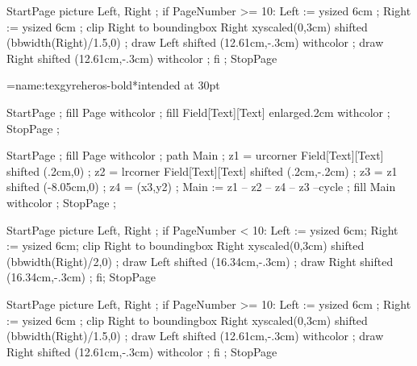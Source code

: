 StartPage
picture Left, Right ;
if PageNumber >= 10:
	Left := \sometxt{\framed[width=1.7cm,offset=0pt,align=middle,frame=off]{\color[outer]{\NumberFont \folio}}} ysized 6cm ; 
	Right := \sometxt{\framed[width=1.7cm,offset=0pt,align=middle,frame=off]{\color[inner]{\NumberFont \folio}}} ysized 6cm ; 
	clip Right to boundingbox Right xyscaled(0,3cm) shifted (bbwidth(Right)/1.5,0) ;
	draw Left shifted (12.61cm,-.3cm)  withcolor  ;
	draw Right shifted (12.61cm,-.3cm)  withcolor  ;
fi ;
StopPage
\stopuseMPgraphic
\endOLDTEX

\beginLUATEX
{}
\font\NumberFont=name:texgyreheros-bold*intended at 30pt


StartPage ;
fill Page withcolor  ;
fill Field[Text][Text] enlarged.2cm withcolor  ;
StopPage ;
\stopuniqueMPgraphic 

StartPage ;
fill Page withcolor  ;
path Main ;
z1 = urcorner Field[Text][Text] shifted (.2cm,0) ;
z2 = lrcorner Field[Text][Text] shifted (.2cm,-.2cm) ;
z3 = z1 shifted (-8.05cm,0) ;
z4 = (x3,y2) ;
Main := z1 -- z2 -- z4 -- z3 --cycle ;
fill Main withcolor  ;
StopPage ;
\stopuniqueMPgraphic

StartPage
picture Left, Right ;
if PageNumber < 10:
	Left := \sometxt{\framed[width=1cm,offset=0pt,align=middle,frame=off]{\color[outer]{\NumberFont \folio}}} ysized 6cm; 
	Right := \sometxt{\framed[width=1cm,offset=0pt,align=middle,frame=off]{\color[inner]{\NumberFont \folio}}} ysized 6cm; 
	clip Right to boundingbox Right xyscaled(0,3cm) shifted (bbwidth(Right)/2,0) ;
	draw Left shifted (16.34cm,-.3cm) ;
	draw Right shifted (16.34cm,-.3cm) ;
fi;
StopPage
\stopuseMPgraphic


StartPage
picture Left, Right ;
if PageNumber >= 10:
	Left := \sometxt{\framed[width=1.7cm,offset=0pt,align=middle,frame=off]{\color[outer]{\NumberFont \folio}}} ysized 6cm ; 
	Right := \sometxt{\framed[width=1.7cm,offset=0pt,align=middle,frame=off]{\color[inner]{\NumberFont \folio}}} ysized 6cm ; 
	clip Right to boundingbox Right xyscaled(0,3cm) shifted (bbwidth(Right)/1.5,0) ;
	draw Left shifted (12.61cm,-.3cm)  withcolor  ;
	draw Right shifted (12.61cm,-.3cm)  withcolor  ;
fi ;
StopPage
\stopuseMPgraphic
\endLUATEX

